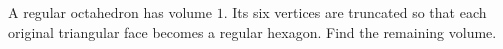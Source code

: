 A regular octahedron has volume $1$. Its six vertices are truncated so that each original triangular face becomes a regular hexagon. Find the remaining volume.

